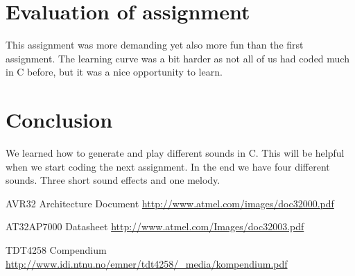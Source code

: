 \documentclass[a4paper,11pt]{article}
\begin{document}
\section{Evaluation of assignment}
This assignment was more demanding yet also more fun than the first assignment. The learning curve was a bit harder as not all of us had coded much in C before, but it was a nice opportunity to learn.

\section{Conclusion}
We learned how to generate and play different sounds in C. This will be helpful when we start coding the next assignment. In the end we have four different sounds. Three short sound effects and one melody. 

\footnotesize{  %
\begin{thebibliography}{N}

 AVR32 Architecture Document
\url{http://www.atmel.com/images/doc32000.pdf}

 AT32AP7000 Datasheet
\url{http://www.atmel.com/Images/doc32003.pdf}

 TDT4258 Compendium
\url{http://www.idi.ntnu.no/emner/tdt4258/_media/kompendium.pdf}

\end{thebibliography}  
}
\end{document}

